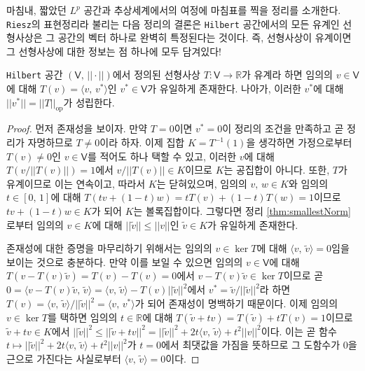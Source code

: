 마침내, 짧았던 $L^p$ 공간과 추상세계에서의 여정에 마침표를 찍을 정리를 소개한다. \texttt{Riesz}의 표현정리라 불리는 다음 정리의 결론은 \texttt{Hilbert} 공간에서의 모든 유계인 선형사상은 그 공간의 벡터 하나로 완벽히 특정된다는 것이다. 즉, 선형사상이 유계이면 그 선형사상에 대한 정보는 점 하나에 모두 담겨있다!

\begin{theorem}
    \texttt{Hilbert} 공간 $(\mathsf{V},\,||\cdot||)$에서 정의된 선형사상 $T:\mathsf{V}\to\mathbb{R}$가 유계라 하면 임의의 $v\in\mathsf{V}$에 대해 $T(v)=\langle v,\,v^*\rangle$인 $v^*\in\mathsf{V}$가 유일하게 존재한다. 나아가, 이러한 $v^*$에 대해 $||v^*||=||T||_{\mathrm{op}}$가 성립한다.
\end{theorem}

\begin{proof}
    먼저 존재성을 보이자. 만약 $T=0$이면 $v^*=0$이 정리의 조건을 만족하고 곧 정리가 자명하므로 $T\ne0$이라 하자. 이제 집합 $K=T^{-1}(1)$을 생각하면 가정으로부터 $T(v)\ne0$인 $v\in\mathsf{V}$를 적어도 하나 택할 수 있고, 이러한 $v$에 대해 $T(v/||T(v)||)=1$에서 $v/||T(v)||\in K$이므로 $K$는 공집합이 아니다. 또한, $T$가 유계이므로 이는 연속이고, 따라서 $K$는 닫혀있으며, 임의의 $v,\,w\in K$와 임의의 $t\in[0,\,1]$에 대해 $T(tv+(1-t)w)=tT(v)+(1-t)T(w)=1$이므로 $tv+(1-t)w\in K$가 되어 $K$는 볼록집합이다. 그렇다면 정리 \ref{thm:smallestNorm}로부터 임의의 $v\in K$에 대해 $||\widetilde{v}||\leq||v||$인 $\widetilde{v}\in K$가 유일하게 존재한다.

    존재성에 대한 증명을 마무리하기 위해서는 임의의 $v\in\ker T$에 대해 $\langle v,\,\widetilde{v}\rangle=0$임을 보이는 것으로 충분하다. 만약 이를 보일 수 있으면 임의의 $v\in\mathsf{V}$에 대해 $T(v-T(v)\widetilde{v})=T(v)-T(v)=0$에서 $v-T(v)\widetilde{v}\in\ker T$이므로 곧 $0=\langle v-T(v)\widetilde{v},\,\widetilde{v}\rangle=\langle v,\,\widetilde{v}\rangle-T(v)||\widetilde{v}||^2$에서 $v^*=\widetilde{v}/||\widetilde{v}||^2$라 하면 $T(v)=\langle v,\,\widetilde{v}\rangle/||\widetilde{v}||^2=\langle v,\,v^*\rangle$가 되어 존재성이 명백하기 때문이다. 이제 임의의 $v\in\ker T$를 택하면 임의의 $t\in\mathbb{R}$에 대해 $T(\widetilde{v}+tv)=T(\widetilde{v})+tT(v)=1$이므로 $\widetilde{v}+tv\in K$에서 $||\widetilde{v}||^2\leq||\widetilde{v}+tv||^2=||\widetilde{v}||^2+2t\langle v,\,\widetilde{v}\rangle+t^2||v||^2$이다. 이는 곧 함수 $t\mapsto||\widetilde{v}||^2+2t\langle v,\,\widetilde{v}\rangle+t^2||v||^2$가 $t=0$에서 최댓값을 가짐을 뜻하므로 그 도함수가 $0$을 근으로 가진다는 사실로부터 $\langle v,\,\widetilde{v}\rangle=0$이다.


\end{proof}
